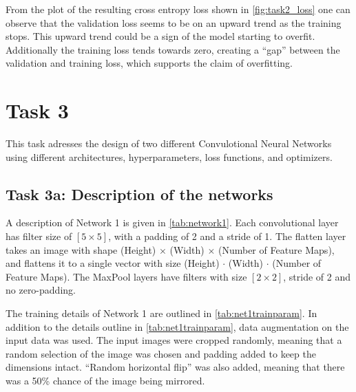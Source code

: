 \documentclass{article}
\begin{document}
From the plot of the resulting cross entropy loss shown in \autoref{fig:task2_loss} one can observe that the validation loss seems to be on an upward trend as the training stops. This upward trend could be a sign of the model starting to overfit. Additionally the training loss tends towards zero, creating a ``gap'' between the validation and training loss, which supports the claim of overfitting.

\section{Task 3}

This task adresses the design of two different Convulotional Neural Networks using different architectures, hyperparameters, loss functions, and optimizers. 

\subsection{Task 3a: Description of the networks}

A description of Network 1 is given in \autoref{tab:network1}. Each convolutional layer has filter size of $[5\times 5]$, with a padding of 2 and a stride of 1. The flatten layer takes an image with shape (Height) $\times$ (Width) $\times$ (Number of Feature Maps), and flattens
it to a single vector with size (Height) $\cdot$ (Width) $\cdot$ (Number of Feature Maps).  The MaxPool layers have filters with size $[2\times2]$, stride of 2 and no zero-padding.

The training details of Network 1 are outlined in \autoref{tab:net1trainparam}. In addition to the details outline in \autoref{tab:net1trainparam}, data augmentation on the input data was used. The input images were cropped randomly, meaning that a random selection of the image was chosen and padding added to keep the dimensions intact. ``Random horizontal flip'' was also added, meaning that there was a 50\% chance of the image being mirrored.   
\end{document}
